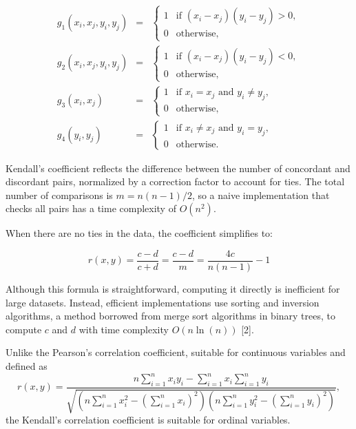 \documentclass[
  10pt,
  letterpaper,
]{article}
\begin{document}
\begin{eqnarray*}
g_1(x_i, x_j, y_i, y_j) &=& \begin{cases}
  1 & \text{if } (x_i - x_j)(y_i - y_j) > 0, \\
  0 & \text{otherwise},
\end{cases} \\
g_2(x_i, x_j, y_i, y_j) &=& \begin{cases}
  1 & \text{if } (x_i - x_j)(y_i - y_j) < 0, \\
  0 & \text{otherwise},
\end{cases} \\
g_3(x_i, x_j) &=& \begin{cases}
  1 & \text{if } x_i = x_j \text{ and } y_i \neq y_j, \\
  0 & \text{otherwise},
\end{cases} \\
g_4(y_i, y_j) &=& \begin{cases}
  1 & \text{if } x_i \neq x_j \text{ and } y_i = y_j, \\
  0 & \text{otherwise}.
\end{cases}
\end{eqnarray*}

Kendall's coefficient reflects the difference between the number of
concordant and discordant pairs, normalized by a correction factor to
account for ties. The total number of comparisons is
\(m = n(n - 1) / 2\), so a naive implementation that checks all pairs
has a time complexity of \(O(n^2)\).

When there are no ties in the data, the coefficient simplifies to:

\begin{equation*}
r(x,y) = \frac{c - d}{c + d} = 
 \frac{c - d}{m} =
 \frac{4c}{n(n - 1)} - 1
\end{equation*}

Although this formula is straightforward, computing it directly is
inefficient for large datasets. Instead, efficient implementations use
sorting and inversion algorithms, a method borrowed from merge sort
algorithms in binary trees, to compute \(c\) and \(d\) with time
complexity \(O(n \ln(n))\) {[}2{]}.

Unlike the Pearson's correlation coefficient, suitable for continuous
variables and defined as \begin{equation*}
r(x,y) = \frac{n\sum_{i=1}^n x_i y_i - \sum_{i=1}^n x_i \sum_{i=1}^n y_i}{\sqrt{(n\sum_{i=1}^n x_i^2 - (\sum_{i=1}^n x_i)^2)(n\sum_{i=1}^n y_i^2 - (\sum_{i=1}^n y_i)^2)}},
\end{equation*} the Kendall's correlation coefficient is suitable for
ordinal variables.
\end{document}
